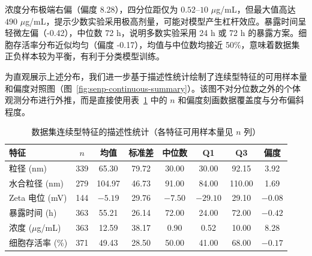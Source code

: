浓度分布极端右偏（偏度 8.28），四分位距仅为 $0.52$--$10$ $\mu$g/mL，但最大值高达 $490$ $\mu$g/mL，提示少数实验采用极高剂量，可能对模型产生杠杆效应。暴露时间呈轻微左偏（-0.42），中位数 72 h，说明多数实验采用 24 h 或 72 h 的暴露方案。细胞存活率分布近似均匀（偏度 -0.17），均值与中位数均接近 50\%，意味着数据集正负样本较为平衡，有利于分类模型训练。

为直观展示上述分布，我们进一步基于描述性统计绘制了连续型特征的可用样本量和偏度对照图（图~\ref{fig:senp-continuous-summary}）。该图不对分位数之外的个体观测分布进行外推，而是直接使用表~\ref{tab:senp_feature_statistics} 中的 $n$ 和偏度刻画数据覆盖度与分布偏斜程度。

\begin{table}[H]
  \centering
  \caption{数据集连续型特征的描述性统计（各特征可用样本量见 $n$ 列）}
  \label{tab:senp_feature_statistics}
  \begin{tabular}{lccccccc}
    \hline
    特征 & $n$ & 均值 & 标准差 & 中位数 & Q1 & Q3 & 偏度 \\
    \hline
    粒径 (nm)            & 339 & 65.30  & 79.72  & 30.00  & 30.00  & 92.15   & 3.92  \\
    水合粒径 (nm)        & 279 & 104.97 & 46.73  & 91.00  & 84.00  & 110.00  & 1.69  \\
    Zeta 电位 (mV)       & 144 & $-5.19$ & 29.76  & $-7.50$ & $-29.10$ & 29.10 & $-0.08$ \\
    暴露时间 (h)         & 363 & 55.21  & 26.14  & 72.00  & 24.00  & 72.00   & $-0.42$ \\
    浓度 ($\mu$g/mL)     & 363 & 12.59  & 38.17  & 0.90   & 0.52   & 10.00   & 8.28  \\
    细胞存活率 (\%)      & 371 & 49.43  & 28.50  & 50.00  & 41.00  & 68.00   & $-0.17$ \\
    \hline
  \end{tabular}
\end{table}

